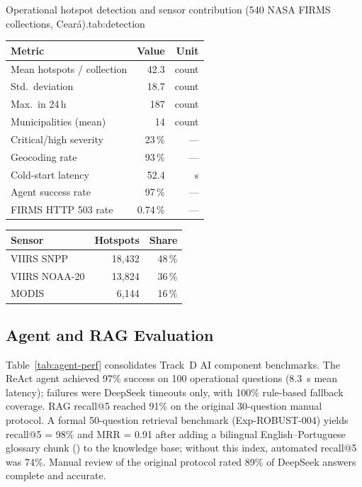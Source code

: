\documentclass[preprint,12pt,times,numbers]{elsarticle}
\begin{document}
\begin{resulttable}{Operational hotspot detection and sensor contribution (540 NASA FIRMS collections, Ceará).}{tab:detection}
\begin{minipage}[t]{0.48\linewidth}
\begin{tabular}{@{}lrr@{}}
\toprule
\textbf{Metric} & \textbf{Value} & \textbf{Unit} \\
\midrule
Mean hotspots / collection & 42.3 & count \\
Std.\ deviation & 18.7 & count \\
Max.\ in 24\,h & 187 & count \\
Municipalities (mean) & 14 & count \\
Critical/high severity & 23\,\% & --- \\
Geocoding rate & 93\,\% & --- \\
Cold-start latency & 52.4 & s \\
Agent success rate & 97\,\% & --- \\
FIRMS HTTP 503 rate & 0.74\,\% & --- \\
\bottomrule
\end{tabular}
\end{minipage}\hfill
\begin{minipage}[t]{0.48\linewidth}
\begin{tabular}{@{}lrr@{}}
\toprule
\textbf{Sensor} & \textbf{Hotspots} & \textbf{Share} \\
\midrule
VIIRS SNPP & 18{,}432 & 48\,\% \\
VIIRS NOAA-20 & 13{,}824 & 36\,\% \\
MODIS & 6{,}144 & 16\,\% \\
\bottomrule
\end{tabular}
\label{tab:sources}
\end{minipage}
\end{resulttable}

\subsection{Agent and RAG Evaluation}
\label{sec:agent-rag}

Table~\ref{tab:agent-perf} consolidates Track~D AI component benchmarks. The ReAct agent achieved 97\% success on 100 operational questions (8.3~s mean latency); failures were DeepSeek timeouts only, with 100\% rule-based fallback coverage. RAG recall@5 reached 91\% on the original 30-question manual protocol. A formal 50-question retrieval benchmark (Exp-ROBUST-004) yields recall@5 = 98\% and MRR = 0.91 after adding a bilingual English--Portuguese glossary chunk () to the knowledge base; without this index, automated recall@5 was 74\%. Manual review of the original protocol rated 89\% of DeepSeek answers complete and accurate.
\end{document}
